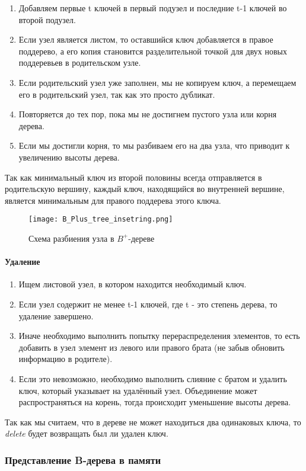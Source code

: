 \documentclass[14pt, russian]{scrartcl}
\begin{document}
\begin{enumerate}
\item Добавляем первые t ключей в первый подузел и последние t-1 ключей во второй подузел.
\item Если узел является листом, то оставшийся ключ добавляется в правое поддерево, а его копия становится разделительной точкой для двух новых поддеревьев в родительском узле.
\item Если родительский узел уже заполнен, мы не копируем ключ, а перемещаем его в родительский узел, так как это просто дубликат.
\item Повторяется до тех пор, пока мы не достигнем пустого узла или корня дерева.
\item Если мы достигли корня, то мы разбиваем его на два узла, что приводит к увеличению высоты дерева.
\end{enumerate}
Так как минимальный ключ из второй половины всегда отправляется в родительскую вершину, каждый ключ, находящийся во внутренней вершине, является минимальным для правого поддерева этого ключа.
\begin{figure}[H]\centering
\texttt{[image: B\_Plus\_tree\_insetring.png]}
\caption{Схема разбиения узла в $B^+$-дереве}
\label{fig::thesis}
\end{figure}


\paragraph{Удаление}
\begin{enumerate}
\item Ищем листовой узел, в котором находится необходимый ключ.
\item Если узел содержит не менее t-1 ключей, где t - это степень дерева, то удаление завершено.
\item Иначе необходимо выполнить попытку перераспределения элементов, то есть добавить в узел элемент из левого или правого брата (не забыв обновить информацию в родителе).
\item Если это невозможно, необходимо выполнить слияние с братом и удалить ключ, который указывает на удалённый узел. Объединение может распространяться на корень, тогда происходит уменьшение высоты дерева.
\end{enumerate}
Так как мы считаем, что в дереве не может находиться два одинаковых ключа, то \textit{delete} будет возвращать был ли удален ключ.

\subsubsection{Представление B-дерева в памяти}
\end{document}
